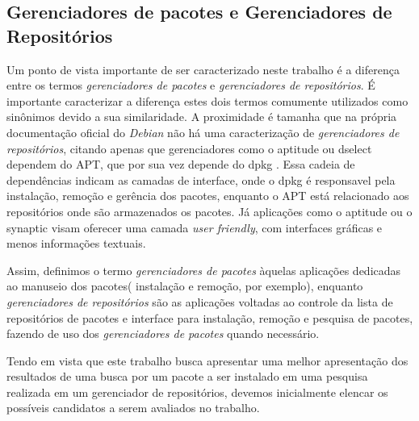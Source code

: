 
\subsection*{Gerenciadores de pacotes e Gerenciadores de Repositórios} %
\label{sec:gerenciadores}


Um ponto de vista importante de ser caracterizado neste trabalho é a diferença entre os termos \textit{ gerenciadores de pacotes} e \textit{gerenciadores de repositórios}.
É importante caracterizar a diferença estes dois termos comumente utilizados como sinônimos devido a sua similaridade. A proximidade é tamanha que na própria documentação oficial do \textit{Debian} não há uma caracterização de \textit{gerenciadores de repositórios}, citando apenas que gerenciadores como o {\code aptitude} ou {\code dselect} dependem do {\code APT}, que por sua vez depende do {\code dpkg} \cite{debian-faq}. Essa cadeia de dependências indicam as camadas de interface, onde o {\code dpkg} é responsavel pela instalação, remoção e gerência dos pacotes, enquanto o {\code APT} está relacionado aos repositórios onde são armazenados os pacotes. Já aplicações como o {\code aptitude} ou o {\code synaptic} visam oferecer uma camada \textit{user friendly}, com interfaces gráficas e menos informações textuais.

Assim, definimos o termo \textit{gerenciadores de pacotes} àquelas aplicações dedicadas ao manuseio dos pacotes( instalação e remoção, por exemplo), enquanto \textit{gerenciadores de repositórios} são as aplicações voltadas ao controle da lista de repositórios de pacotes e interface  para instalação, remoção e pesquisa de pacotes, fazendo de uso dos \textit{gerenciadores de pacotes} quando necessário.

Tendo em vista que este trabalho busca apresentar uma melhor apresentação dos resultados de uma busca por um pacote a ser instalado em uma pesquisa realizada em um gerenciador de repositórios, devemos inicialmente elencar os possíveis candidatos a serem avaliados no trabalho.


